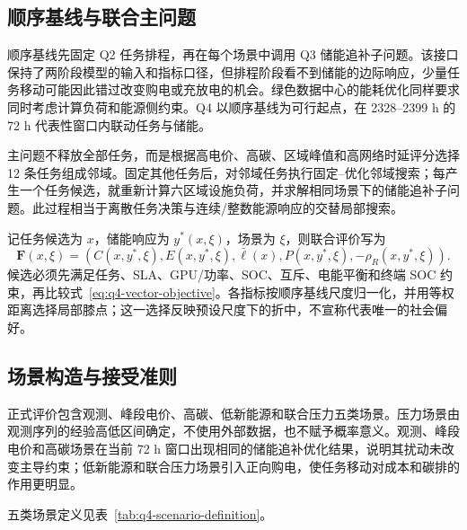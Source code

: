\subsection{顺序基线与联合主问题}

顺序基线先固定 Q2 任务排程，再在每个场景中调用 Q3 储能追补子问题。该接口保持了两阶段模型的输入和指标口径，但排程阶段看不到储能的边际响应，少量任务移动可能因此错过改变购电或充放电的机会。绿色数据中心的能耗优化同样要求同时考虑计算负荷和能源侧约束。Q4 以顺序基线为可行起点，在 2328--2399 h 的 72 h 代表性窗口内联动任务与储能。

主问题不释放全部任务，而是根据高电价、高碳、区域峰值和高网络时延评分选择 12 条任务组成邻域。固定其他任务后，对邻域任务执行固定--优化邻域搜索；每产生一个任务候选，就重新计算六区域设施负荷，并求解相同场景下的储能追补子问题。此过程相当于离散任务决策与连续/整数能源响应的交替局部搜索。

记任务候选为 $x$，储能响应为 $y^*(x,\xi)$，场景为 $\xi$，则联合评价写为
\begin{equation}
  \boldsymbol F(x,\xi)=
  \left(C(x,y^*,\xi),E(x,y^*,\xi),\bar\ell(x),P(x,y^*,\xi),-\rho_R(x,y^*,\xi)\right).
  \label{eq:q4-vector-objective}
\end{equation}
候选必须先满足任务、SLA、GPU/功率、SOC、互斥、电能平衡和终端 SOC 约束，再比较式~\eqref{eq:q4-vector-objective}。各指标按顺序基线尺度归一化，并用等权距离选择局部膝点；这一选择反映预设尺度下的折中，不宣称代表唯一的社会偏好。

\subsection{场景构造与接受准则}

正式评价包含观测、峰段电价、高碳、低新能源和联合压力五类场景。压力场景由观测序列的经验高低区间确定，不使用外部数据，也不赋予概率意义。观测、峰段电价和高碳场景在当前 72 h 窗口出现相同的储能追补优化结果，说明其扰动未改变主导约束；低新能源和联合压力场景引入正向购电，使任务移动对成本和碳排的作用更明显。

五类场景定义见表~\ref{tab:q4-scenario-definition}。

